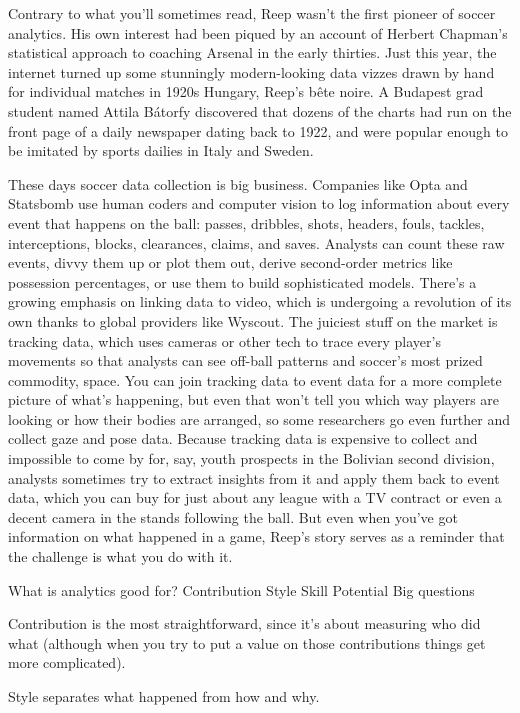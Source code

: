 Contrary to what you’ll sometimes read, Reep wasn’t the first pioneer of 
soccer analytics. His own interest had been piqued by an account of Herbert 
Chapman’s statistical approach to coaching Arsenal in the early thirties. 
Just this year, the internet turned up some stunningly modern-looking 
data vizzes drawn by hand for individual matches in 1920s Hungary, Reep’s 
bête noire. A Budapest grad student named Attila Bátorfy discovered that 
dozens of the charts had run on the front page of a daily newspaper dating 
back to 1922, and were popular enough to be imitated by sports dailies in 
Italy and Sweden.

These days soccer data collection is big business. Companies like Opta and 
Statsbomb use human coders and computer vision to log information about 
every event that happens on the ball: passes, dribbles, shots, headers, 
fouls, tackles, interceptions, blocks, clearances, claims, and saves. 
Analysts can count these raw events, divvy them up or plot them out, 
derive second-order metrics like possession percentages, or use them 
to build sophisticated models. There’s a growing emphasis on linking 
data to video, which is undergoing a revolution of its own thanks to 
global providers like Wyscout. The juiciest stuff on the market is 
tracking data, which uses cameras or other tech to trace every 
player’s movements so that analysts can see off-ball patterns 
and soccer’s most prized commodity, space. You can join tracking 
data to event data for a more complete picture of what’s happening, 
but even that won’t tell you which way players are looking or how 
their bodies are arranged, so some researchers go even further and 
collect gaze and pose data. Because tracking data is expensive to 
collect and impossible to come by for, say, youth prospects in the 
Bolivian second division, analysts sometimes try to extract insights 
from it and apply them back to event data, which you can buy for just 
about any league with a TV contract or even a decent camera in the 
stands following the ball. But even when you’ve got information on 
what happened in a game, Reep’s story serves as a reminder that 
the challenge is what you do with it.

What is analytics good for?
Contribution
Style
Skill
Potential
Big questions

Contribution is the most straightforward, since it’s about measuring who 
did what (although when you try to put a value on those contributions 
things get more complicated). 

Style separates what happened from how and why.

